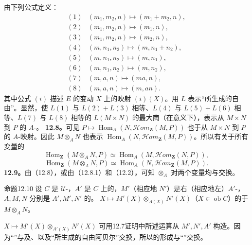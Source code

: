 由下列公式定义：
\[
\begin{array}{lll}
(1)&(m_1,m_2,n)\longmapsto(m_1+m_2,n),\\
(2)&(m_1,m_2,n)\longmapsto(m_1,n),\\
(3)&(m_1,m_2,n)\longmapsto(m_2,n),\\
(4)&(m,n_1,n_2)\longmapsto(m,n_1+n_2),\\
(5)&(m,n_1,n_2)\longmapsto(m,n_1),\\
(6)&(m,n_1,n_2)\longmapsto(m,n_2),\\
(7)&(m,a,n)\longmapsto(ma,n),\\
(8)&(m,a,n)\longmapsto(m,an).
\end{array}
\]
其中公式 $(i)$ 描述 $E$ 的变动 $X$ 上的映射 $(i)(X)$。用 $L$ 表示“所生成的自由”。显然，使 $L(1)$ 与 $L(2)+L(3)$ 相等、$L(4)$ 与 $L(5)+L(6)$ 相等、$L(7)$ 与 $L(8)$ 相等的 $L(M\times N)$ 的最大商（在意义下），表示从 $M\times N$ 到 $P$ 的 $A$-。
\textbf{12.8。}可见 $P\mapsto\operatorname{Hom}_A(N,\mathscr{H}\!om_{\mathbf Z}(M,P))$ 也于从 $M\times N$ 到 $P$ 的 $A$-映射。因此 $M\otimes_A N$ 也表示 $\operatorname{Hom}_A(N,\mathscr{H}\!om_{\mathbf Z}(M,P))$。所以有关于所有变量的
\[\operatorname{Hom}_{\mathbf Z}(M\otimes_A N,P)\simeq\operatorname{Hom}_A(M,\mathscr{H}\!om_{\mathbf Z}(N,P)),\tag{12.8.1}\]
\[\operatorname{Hom}_{\mathbf Z}(M\otimes_A N,P)\simeq\operatorname{Hom}_A(N,\mathscr{H}\!om_{\mathbf Z}(M,P)).\tag{12.8.2}\]
\textbf{12.9。}由（12.8），或由（12.8.1）和（12.2），可知 $\otimes_A$ 对两个变量均与交换。
\begin{SGAresult}{命题}{12.10}
设 $C$ 是 $\mathcal U$-，$A'$ 是 $C$ 上的，$M'$（相应地 $N'$）是右（相应地左）$A'$-，$A,M,N$ 分别是 $A',M',N'$ 的。 $X\mapsto M'(X)\otimes_{A(X)}N'(X)$（$X\in\operatorname{ob}C$）的于 $M\otimes_A N$。
\end{SGAresult}
 $X\mapsto M'(X)\otimes_{A'(X)}N'(X)$ 可用12.7证明中所述运算从 $M',N',A'$ 构造。因为“”与及、以及“所生成的自由阿贝尔”交换，所以的形成与“”交换。
